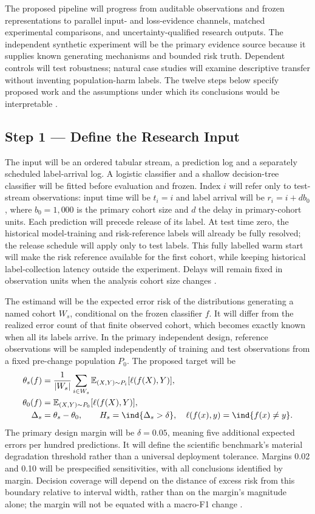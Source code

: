 The proposed pipeline will progress from auditable observations and frozen representations to parallel input- and loss-evidence channels, matched experimental comparisons, and uncertainty-qualified research outputs. The independent synthetic experiment will be the primary evidence source because it supplies known generating mechanisms and bounded risk truth. Dependent controls will test robustness; natural case studies will examine descriptive transfer without inventing population-harm labels. The twelve steps below specify proposed work and the assumptions under which its conclusions would be interpretable \cite{cerqueira,window,souza}.

\subsection*{Step 1 --- Define the Research Input}
The input will be an ordered tabular stream, a prediction log and a separately scheduled label-arrival log. A logistic classifier and a shallow decision-tree classifier will be fitted before evaluation and frozen. Index $i$ will refer only to test-stream observations: input time will be $t_i=i$ and label arrival will be $r_i=i+db_0$, where $b_0=1{,}000$ is the primary cohort size and $d$ the delay in primary-cohort units. Each prediction will precede release of its label. At test time zero, the historical model-training and risk-reference labels will already be fully resolved; the release schedule will apply only to test labels. This fully labelled warm start will make the risk reference available for the first cohort, while keeping historical label-collection latency outside the experiment. Delays will remain fixed in observation units when the analysis cohort size changes \cite{souza,alencar}.

The estimand will be the expected error risk of the distributions generating a named cohort $W_s$, conditional on the frozen classifier $f$. It will differ from the realized error count of that finite observed cohort, which becomes exactly known when all its labels arrive. In the primary independent design, reference observations will be sampled independently of training and test observations from a fixed pre-change population $P_0$. The proposed target will be
\begin{align}
\theta_s(f)&=\frac{1}{|W_s|}\sum_{i\in W_s}\mathbb{E}_{(X,Y)\sim P_i}[\ell(f(X),Y)],\\
\theta_0(f)&=\mathbb{E}_{(X,Y)\sim P_0}[\ell(f(X),Y)],\\
\Delta_s&=\theta_s-\theta_0,\qquad H_s=\ind\{\Delta_s>\delta\},
\quad \ell(f(x),y)=\ind\{f(x)\ne y\}.
\end{align}
The primary design margin will be $\delta=0.05$, meaning five additional expected errors per hundred predictions. It will define the scientific benchmark's material degradation threshold rather than a universal deployment tolerance. Margins 0.02 and 0.10 will be prespecified sensitivities, with all conclusions identified by margin. Decision coverage will depend on the distance of excess risk from this boundary relative to interval width, rather than on the margin's magnitude alone; the margin will not be equated with a macro-F1 change \cite{souza,hoeffding}.

